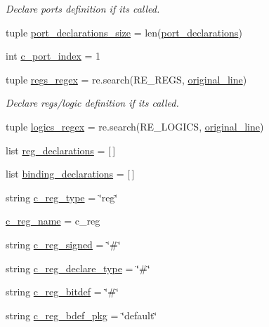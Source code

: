 \begin{DoxyCompactItemize}
\begin{DoxyCompactList}\small\item\em Declare ports definition if its called. \end{DoxyCompactList}\item 
tuple \hyperlink{namespaceveripy_ad074898a0ed151cd31c981e01863e64b}{port\-\_\-declarations\-\_\-size} = len(\hyperlink{namespaceveripy_a99fccb7245b05a502fd01a6cd7ed1c22}{port\-\_\-declarations})
\item 
int \hyperlink{namespaceveripy_ac0090bfe22807ee67cf30a98d6996df7}{c\-\_\-port\-\_\-index} = 1
\item 
tuple \hyperlink{namespaceveripy_a115fffb30dfd5bc7abf758cd49319c4b}{regs\-\_\-regex} = re.\-search(R\-E\-\_\-\-R\-E\-G\-S, \hyperlink{namespaceveripy_ab15a6bb1f76d3b0db1c63066479489eb}{original\-\_\-line})
\begin{DoxyCompactList}\small\item\em Declare regs/logic definition if its called. \end{DoxyCompactList}\item 
tuple \hyperlink{namespaceveripy_ae0b7b329f168ad945a5a19f369c6c1a3}{logics\-\_\-regex} = re.\-search(R\-E\-\_\-\-L\-O\-G\-I\-C\-S, \hyperlink{namespaceveripy_ab15a6bb1f76d3b0db1c63066479489eb}{original\-\_\-line})
\item 
list \hyperlink{namespaceveripy_a8e6f82dc889c14d2c0a5f7eff6fa3e5b}{reg\-\_\-declarations} = \mbox{[}$\,$\mbox{]}
\item 
list \hyperlink{namespaceveripy_aa819d294a75b937f82b683bc7b600ce5}{binding\-\_\-declarations} = \mbox{[}$\,$\mbox{]}
\item 
string \hyperlink{namespaceveripy_a28beb86ef22e1797f2a263e0b7bde37e}{c\-\_\-reg\-\_\-type} = \char`\"{}reg\char`\"{}
\item 
\hyperlink{namespaceveripy_afaf13bf78939e59406822568cf5b0a89}{c\-\_\-reg\-\_\-name} = c\-\_\-reg
\item 
string \hyperlink{namespaceveripy_a340fd491db72cef85a27ed7d34825e2f}{c\-\_\-reg\-\_\-signed} = \char`\"{}\#\char`\"{}
\item 
string \hyperlink{namespaceveripy_aac1a795f2897a14f50b950dbc2cfa757}{c\-\_\-reg\-\_\-declare\-\_\-type} = \char`\"{}\#\char`\"{}
\item 
string \hyperlink{namespaceveripy_a2f11355e71ca5cd6780e85c1e9391a42}{c\-\_\-reg\-\_\-bitdef} = \char`\"{}\#\char`\"{}
\item 
string \hyperlink{namespaceveripy_ae01bdc8e4c1dee6732155756ad5a4cf2}{c\-\_\-reg\-\_\-bdef\-\_\-pkg} = \char`\"{}default\char`\"{}

\end{DoxyCompactItemize}

